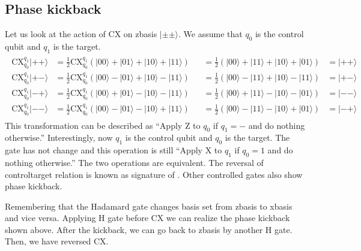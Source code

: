 \documentclass[letterpaper,10pt,english]{jupyterBook}
\begin{document}
\subsection{Phase kickback}
\label{\detokenize{q2gates/cx:phase-kickback}}\label{\detokenize{q2gates/cx:ssec-cx-kickback}}
\sphinxAtStartPar
Let us look at the action of CX on z\sphinxhyphen{}basis \(|\pm\pm\rangle\).  We assume that \(q_0\) is the control qubit and \(q_1\) is the target.
\begin{equation*}
\begin{split}
\begin{align}
\text{CX}_{q_0}^{q_1} |++\rangle &= \frac{1}{2} \text{CX}_{q_0}^{q_1} \left(|00\rangle + |01\rangle  + |10\rangle + |11\rangle \right)
&&=  \frac{1}{2} \left(|00\rangle + |11\rangle  + |10\rangle + |01\rangle \right) &= |++\rangle \\
\text{CX}_{q_0}^{q_1} |+-\rangle &= \frac{1}{2} \text{CX}_{q_0}^{q_1} \left(|00\rangle - |01\rangle  + |10\rangle - |11\rangle \right)
&&=  \frac{1}{2} \left(|00\rangle - |11\rangle  + |10\rangle - |11\rangle \right) &= |+-\rangle \\
\text{CX}_{q_0}^{q_1} |-+\rangle &= \frac{1}{2} \text{CX}_{q_0}^{q_1} \left(|00\rangle + |01\rangle  - |10\rangle - |11\rangle \right)
&&=  \frac{1}{2} \left(|00\rangle + |11\rangle  - |10\rangle - |01\rangle \right) &= |--\rangle \\
\text{CX}_{q_0}^{q_1} |--\rangle &= \frac{1}{2} \text{CX}_{q_0}^{q_1} \left(|00\rangle - |01\rangle  - |10\rangle + |11\rangle \right)
&&=  \frac{1}{2} \left(|00\rangle - |11\rangle  - |10\rangle + |01\rangle \right) &= |-+\rangle
\end{align}
\end{split}
\end{equation*}
\sphinxAtStartPar
This transformation can be described as “Apply Z to \(q_0\) if \(q_1=-\) and do nothing otherwise.” Interestingly, now \(q_1\) is the control qubit and \(q_0\) is the target.  The gate has not change and  this operation is still “Apply X to \(q_1\) if \(q_0=1\) and do nothing otherwise.”  The two operations are equivalent. The reversal of control\sphinxhyphen{}target relation is known as signature of .  Other controlled gates also show phase kickback.

\sphinxAtStartPar
Remembering that the Hadamard gate changes basis set from z\sphinxhyphen{}basis to x\sphinxhyphen{}basis and vice versa. Applying H gate before CX we can realize the phase kickback shown above. After the kickback, we can go back to z\sphinxhyphen{}basis by another H gate. Then, we have reversed CX.
\end{document}
